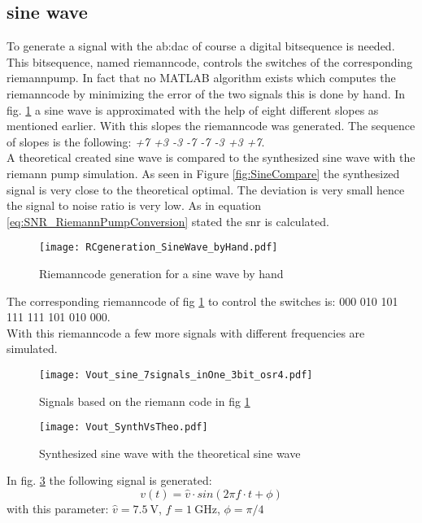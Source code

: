 \subsection{sine wave}
To generate a signal with the \gls{ab:dac} of course a digital bitsequence is needed. This bitsequence, named riemanncode, controls the switches of the corresponding riemannpump. In fact that no MATLAB algorithm exists which computes the riemanncode by minimizing the error of the two signals this is done by hand. In fig. \ref{fig:SineWaveCodeGeneration} a sine wave is approximated with the help of eight different slopes as mentioned earlier. With this slopes the riemanncode was generated. The sequence of slopes is the following: \textit{+7 +3 -3 -7 -7 -3 +3 +7}.\\

A theoretical created sine wave is compared to the synthesized sine wave with the riemann pump simulation. As seen in Figure \ref{fig:SineCompare} the synthesized signal is very close to the theoretical optimal. The deviation is very small hence the signal to noise ratio is very low. As in equation \ref{eq:SNR_RiemannPumpConversion} stated the snr is calculated.


 \begin{figure}[htb!]
   \centering
   \texttt{[image: RCgeneration\_SineWave\_byHand.pdf]}
   \caption{Riemanncode generation for a sine wave by hand}
   \label{fig:SineWaveCodeGeneration}
\end{figure}
The corresponding riemanncode of fig \ref{fig:SineWaveCodeGeneration} to control the switches is: 000 010 101 111 111 101 010 000.\\
With this riemanncode a few more signals with different frequencies are simulated.

\begin{figure}[htb!]
   \centering
   \texttt{[image: Vout\_sine\_7signals\_inOne\_3bit\_osr4.pdf]}
   \caption{Signals based on the riemann code in fig \ref{fig:SineWaveCodeGeneration}}
   \label{fig:SineWavesGeneration}
\end{figure}
 
\begin{figure}[htb!]
   \centering
   \texttt{[image: Vout\_SynthVsTheo.pdf]}
   \caption{Synthesized sine wave with the theoretical sine wave}
   \label{fig:SineWaveSynthVsTheoretical}
\end{figure}
In fig. \ref{fig:SineWaveSynthVsTheoretical} the following signal is generated:
\begin{equation}
v(t)= \widehat{v} \cdot sin( 2  \pi  f \cdot  t + \phi)
\end{equation}
with this parameter: $\widehat{v} = \SI{7.5}{\volt}$, $f = \SI{1}{\giga \hertz}$, $\phi = \pi / 4$


